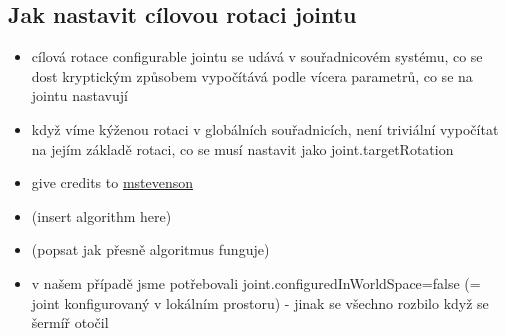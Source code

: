 \subsection{Jak nastavit cílovou rotaci jointu} \label{howToSetJointsTargetRotationSection}
\begin{itemize}
  \item cílová rotace configurable jointu se udává v souřadnicovém systému, co se dost kryptickým způsobem vypočítává podle vícera parametrů, co se na jointu nastavují
  \item když víme kýženou rotaci v globálních souřadnicích, není triviální vypočítat na jejím základě rotaci, co se musí nastavit jako joint.targetRotation
  \item give credits to \href{https://gist.github.com/mstevenson/4958837}{mstevenson}
  \item (insert algorithm here)
  \item (popsat jak přesně algoritmus funguje)
  \item v našem případě jsme potřebovali joint.configuredInWorldSpace=false (= joint konfigurovaný v lokálním prostoru) - jinak se všechno rozbilo když se šermíř otočil 
\end{itemize}

